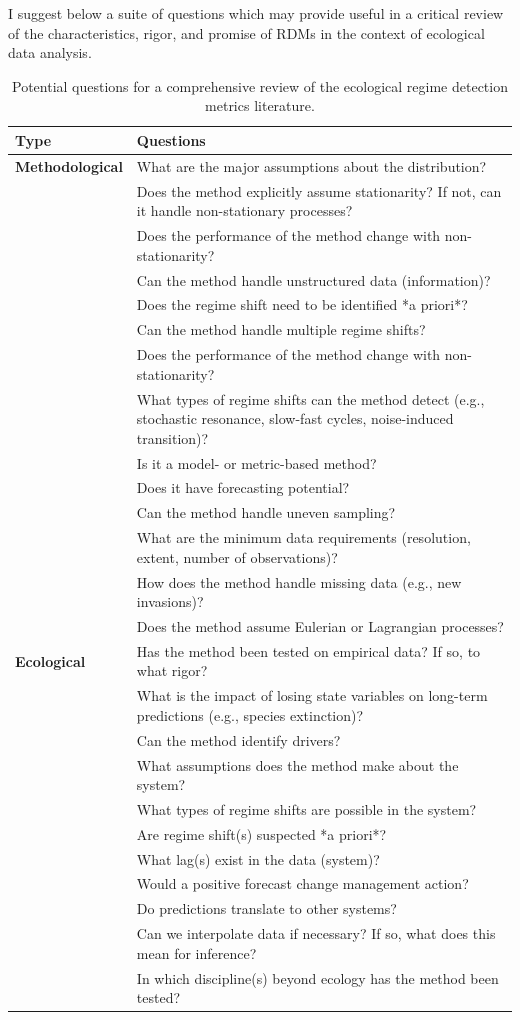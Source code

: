 \documentclass[12pt,twoside,openany]{reedthesis}
\begin{document}
I suggest below a suite of questions which may provide useful in a critical review of the characteristics, rigor, and promise of RDMs in the context of ecological data analysis.
\begin{longtable}{>{\bfseries}l|>{\raggedright\arraybackslash}p{30em}}
\caption{\label{tab:nextStepsTab}Potential questions for a comprehensive review of the ecological regime detection metrics literature.}\\
\toprule
Type & Questions\\
\midrule
Methodological & What are the major assumptions about the distribution?\\
 & Does the method explicitly assume stationarity? If not, can it handle non-stationary processes?\\
 & Does the performance of the method change with non-stationarity?\\
 & Can the method handle unstructured data (information)?\\
 & Does the regime shift need to be identified *a priori*?\\
\addlinespace
 & Can the method handle multiple regime shifts?\\
 & Does the performance of the method change with non-stationarity?\\
 & What types of regime shifts can the method detect (e.g., stochastic resonance, slow-fast cycles, noise-induced transition)?\\
 & Is it a model- or metric-based method?\\
 & Does it have forecasting potential?\\
\addlinespace
 & Can the method handle uneven sampling?\\
 & What are the minimum data requirements (resolution, extent, number of observations)?\\
 & How does the method handle missing data (e.g., new invasions)?\\
 & Does the method assume Eulerian or Lagrangian processes?\\
Ecological & Has the method been tested on empirical data? If so, to what rigor?\\
\addlinespace
 & What is the impact of losing state variables on long-term predictions (e.g., species extinction)?\\
 & Can the method identify drivers?\\
 & What assumptions does the method make about the system?\\
 & What types of regime shifts are possible in the system?\\
 & Are regime shift(s) suspected *a priori*?\\
\addlinespace
 & What lag(s) exist in the data (system)?\\
 & Would a positive forecast change management action?\\
 & Do predictions translate to other systems?\\
 & Can we interpolate data if necessary? If so, what does this mean for inference?\\
 & In which discipline(s) beyond ecology has the method been tested?\\
\bottomrule
\end{longtable}
\end{document}
